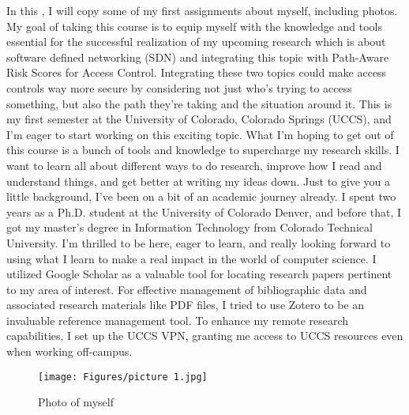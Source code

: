 \documentclass{article}
\begin{document}
\begin{text}
In this , I will copy some of my first assignments about myself, including photos. 
My goal of taking this course is to equip myself with the knowledge and tools essential for the successful realization of my upcoming research which is about software defined networking (SDN) and integrating this topic with Path-Aware Risk Scores for Access Control. Integrating these two topics could make access controls way more secure by considering not just who's trying to access something, but also the path they're taking and the situation around it.
This is my first semester at the University of Colorado, Colorado Springs (UCCS), and I'm eager to start working on this exciting topic. What I'm hoping to get out of this course is a bunch of tools and knowledge to supercharge my research skills. I want to learn all about different ways to do research, improve how I read and understand things, and get better at writing my ideas down.
Just to give you a little background, I've been on a bit of an academic journey already. I spent two years as a Ph.D. student at the University of Colorado Denver, and before that, I got my master's degree in Information Technology from Colorado Technical University.
I'm thrilled to be here, eager to learn, and really looking forward to using what I
learn to make a real impact in the world of computer science. 
I utilized Google Scholar as a valuable tool for locating research papers pertinent to my area of interest. For effective management of bibliographic data and associated research materials like PDF files, I tried to use Zotero to be an invaluable reference management tool. To enhance my remote research capabilities, I set up the UCCS VPN, granting me access to UCCS resources even when working off-campus.
\begin{figure}
    \center
    \texttt{[image: Figures/picture 1.jpg]}
    \caption{Photo of myself}
\end{figure}


\end{text}
\end{document}
